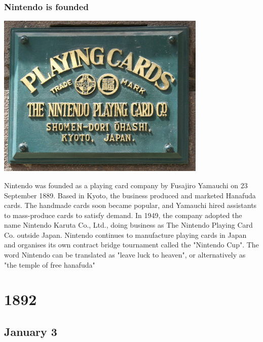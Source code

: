 \documentclass[11pt]{report}
\begin{document}
\subsection{Nintendo is founded}
\vspace{2mm}\begin{center}\includegraphics[width=10cm]{./img/nintendoFounded.jpg}\end{center}
Nintendo was founded as a playing card company by Fusajiro Yamauchi on 23 September 1889. Based in Kyoto, the business produced and marketed Hanafuda cards. The handmade cards soon became popular, and Yamauchi hired assistants to mass-produce cards to satisfy demand. In 1949, the company adopted the name Nintendo Karuta Co., Ltd., doing business as The Nintendo Playing Card Co. outside Japan. Nintendo continues to manufacture playing cards in Japan and organises its own contract bridge tournament called the "Nintendo Cup". The word Nintendo can be translated as "leave luck to heaven", or alternatively as "the temple of free hanafuda"

\chapter{1892}
\section{January 3}
\end{document}
